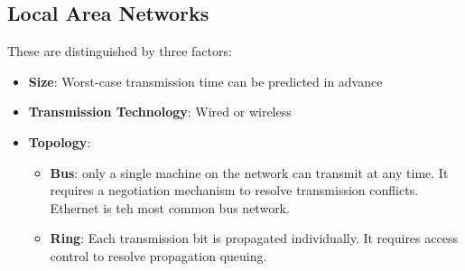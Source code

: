 \documentclass[twoside]{article}
\begin{document}
\subsection{Local Area Networks}
These are distinguished by three factors:
\begin{itemize}
    \item \textbf{Size}: Worst-case transmission time can be predicted in advance
    \item \textbf{Transmission Technology}: Wired or wireless
    \item \textbf{Topology}:
        \begin{itemize}
            \item \textbf{Bus}: only a single machine on the network can 
            transmit at any time. It requires a negotiation mechanism to resolve
            transmission conflicts. Ethernet is teh most common bus network.
            \item \textbf{Ring}: Each transmission bit is propagated 
            individually. It requires access control to resolve propagation
            queuing.
        \end{itemize}
\end{itemize}
\end{document}
